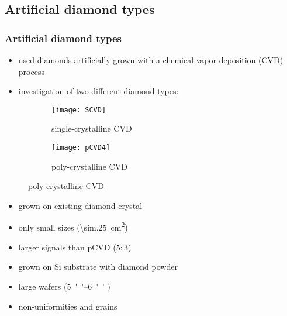 \subsection{Artificial diamond types}
\begin{frame}
	\frametitle{Artificial diamond types}
	\begin{itemize}
		\item used diamonds artificially grown with a chemical vapor deposition (CVD) process
		\item investigation of two different diamond types:
	\end{itemize}
	\begin{figure}[h] 
		\begin{center}
			\begin{subfigure}{0.45\textwidth}  
				\centering 
				\texttt{[image: SCVD]}
				\caption{single-crystalline CVD}
			\end{subfigure}
			\begin{subfigure}{0.45\textwidth} 
				\centering 
				\texttt{[image: pCVD4]}
				\caption{poly-crystalline CVD} 	
			\end{subfigure} 
		\end{center}
	\end{figure}
	\begin{minipage}{5.5cm}
		\begin{itemize}
			\item grown on existing diamond crystal
			\item only small sizes (\SI{\sim.25}{cm^2})
			\item larger signals than pCVD ($5:3$)
		\end{itemize}
	\end{minipage}
	\hspace*{.5cm}
	\begin{minipage}{5cm}
		\begin{itemize}
			\item grown on Si substrate with diamond powder
			\item large wafers (\SIrange{5}{6}{''} \diameter)
			\item non-uniformities and grains
		\end{itemize}
	\end{minipage}
\end{frame}
